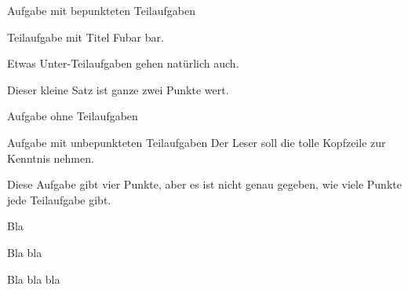 \documentclass[fleqn]{solution}
\begin{document}
	\maketitle
	
	\pointtable

	\begin{exercise}{Aufgabe mit bepunkteten Teilaufgaben}
		\begin{subexercise}[5]{Teilaufgabe mit Titel}
			Fubar bar. 

			\begin{subsubexercise}{Etwas}
				Unter-Teilaufgaben gehen natürlich auch.
			\end{subsubexercise} 

			\begin{subsubexercise}{}
				\lipsum[1]
			\end{subsubexercise}
		\end{subexercise}
		\begin{subexercise}[2]{}
			Dieser kleine Satz ist ganze zwei Punkte wert.
		\end{subexercise} 
	\end{exercise}
	 
	\begin{exercise}[2.5]{Aufgabe ohne Teilaufgaben}
		\lipsum[2-3]
	\end{exercise}
	
	\begin{exercise}[4]{Aufgabe mit unbepunkteten Teilaufgaben}
		Der Leser soll die tolle Kopfzeile zur Kenntnis nehmen.

		Diese Aufgabe gibt vier Punkte, aber es ist nicht genau gegeben,
		wie viele Punkte jede Teilaufgabe gibt.

		\begin{subexercise}{}
			Bla
		\end{subexercise}
		\begin{subexercise}{}
			Bla bla
		\end{subexercise}
		\begin{subexercise}{}
			Bla bla bla
		\end{subexercise}
	\end{exercise}
\end{document}
